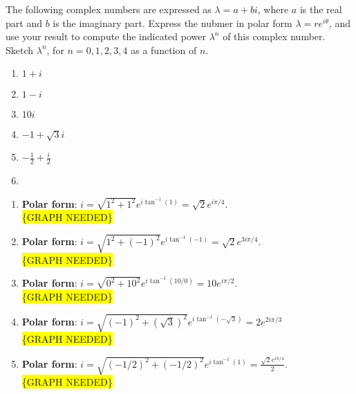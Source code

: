 \documentclass[
    classnum=MATH564,
    classname=MATHEMATICAL\ MODELING,
    due=January\ 28\,\ 2020,
    author=Gabrielle\ Streeter\qquad Hannah\ Wu\qquad\ Minghang\ Li,
    authorshort=Streeter\ \&\ Wu\ \&\ Li,
    teacher= Zachary\ M.\ Boyd,
    hw=1
]{hw-template}
\newcommand{\requiregraph}{\colorbox{yellow}{\{GRAPH NEEDED\}}}
\begin{document}
\begin{homeworkProblem}
The following complex numbers are expressed as $\lambda = a+bi$, where $a$ is the
real part and $b$ is the imaginary part. Express the nubmer in polar form
$\lambda = re^{i\theta}$, and use your result to compute the indicated power
$\lambda^n$ of this complex number. Sketch $\lambda^n$, for $n = 0, 1, 2, 3, 4$
as a function of $n$.
\begin{multicols}{2}
    \begin{enumerate}
        \item $1+i$
        \item $1-i$
        \item $10i$
        \item $-1+\sqrt{3}i$
        \item $-\frac{1}{2} + \frac{i}{2}$
        \item[\vspace{\fill}] %
    \end{enumerate}
\end{multicols}

\segline

\solution

\begin{enumerate}

\item \textbf{Polar form}: $i = \sqrt{1^2 + 1^2} e^{i\tan^{-1}(1)} = \sqrt{2} e^{i\pi/4}$.\\ \requiregraph
\item \textbf{Polar form}: $i = \sqrt{1^2 + (-1)^2} e^{i\tan^{-1}(-1)} = \sqrt{2} e^{3i\pi/4}$.\\ \requiregraph
\item \textbf{Polar form}: $i = \sqrt{0^2 + 10^2} e^{i\tan^{-1}(10/0)} = 10e^{i\pi/2}$.\\ \requiregraph
\item \textbf{Polar form}: $i = \sqrt{(-1)^2 + (\sqrt{3})^2} e^{i\tan^{-1}(-\sqrt{3})} = 2e^{2i\pi/3}$ \\ \requiregraph
\item \textbf{Polar form}: $i = \sqrt{(-1/2)^2 + (-1/2)^2} e^{i\tan^{-1}(1)} = \frac{\sqrt{2}e^{i\pi/4}}{2}$.\\ \requiregraph
\end{enumerate}
\end{homeworkProblem}

\pagebreak
\end{document}
